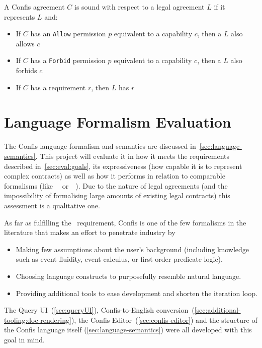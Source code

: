 \begin{definition}[Soundness]
    \label{def:soundness}
    A Confis agreement $C$ is sound with respect to a legal agreement $L$ if it represents $L$ and:

    \begin{itemize}
        \item If $C$ has an \texttt{Allow} permission $p$ equivalent to a capability $c$, then a $L$ also allows $c$
        \item If $C$ has a \texttt{Forbid} permission $p$ equivalent to a capability $c$, then a $L$ also forbids $c$
        \item If $C$ has a requirement $r$, then $L$ has $r$
    \end{itemize}
\end{definition}


\section{Language Formalism Evaluation}\label{sec:language-formalism-evaluation}

The Confis language formalism and semantics are discussed in~\autoref{sec:language-semantics}.
This project will evaluate it in how it meets the requirements described in~\autoref{sec:eval:goals}, its expressiveness (how capable it is to represent complex contracts) as well as how it performs in relation to comparable formalisms (like~~\cite{symboleo2020} or~~\cite{accordHomepage}).
Due to the nature of legal agreements (and the impossibility of formalising large amounts of existing legal contracts) this assessment is a qualitative one.

As far as fulfilling the~ requirement, Confis is one of the few formalisms in the literature that makes an effort to penetrate industry by
\begin{itemize}
    \item Making few assumptions about the user's background (including knowledge such as event fluidity, event calculus, or first order predicate logic).
    \item Choosing language constructs to purposefully resemble natural language.
    \item Providing additional tools to ease development and shorten the iteration loop.
\end{itemize}

The Query UI~(\autoref{sec:queryUI}), Confis-to-English conversion~(\autoref{sec:additional-tooling:doc-rendering}), the Confis Editor~(\autoref{sec:confis-editor}) and the structure of the Confis language itself (\autoref{sec:language-semantics}) were all developed with this goal in mind.


